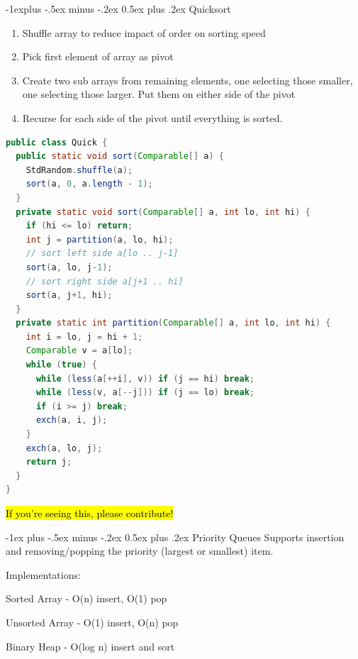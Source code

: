 \documentclass[letterpaper, 8pt]{extarticle}
\makeatletter
\renewcommand{\section}{\@startsection{section}{1}{0mm}%
                                {-1ex plus -.5ex minus -.2ex}%
                                {0.5ex plus .2ex}%
                                {\normalfont\normalsize\bfseries}}
\renewcommand{\subsection}{\@startsection{subsection}{2}{0mm}%
                                {-1explus -.5ex minus -.2ex}%
                                {0.5ex plus .2ex}%
                                {\normalfont\small\bfseries}}
\makeatother
\begin{document}
\begin{multicols*}{4}
  \subsection{Quicksort}
  \begin{enumerate}
    \item Shuffle array to reduce impact of order on sorting speed
    \item Pick first element of array as pivot
    \item Create two sub arrays from remaining elements, one selecting those smaller,
    one selecting those larger. Put them on either side of the pivot
    \item Recurse for each side of the pivot until everything is sorted.
  \end{enumerate}
  \begin{lstlisting}[language=Java, breaklines=true, postbreak=\mbox{\textcolor{red}{$\hookrightarrow$}\space}]
public class Quick {
  public static void sort(Comparable[] a) {
    StdRandom.shuffle(a);
    sort(a, 0, a.length - 1);
  }
  private static void sort(Comparable[] a, int lo, int hi) {
    if (hi <= lo) return;
    int j = partition(a, lo, hi);
    // sort left side a[lo .. j-1]
    sort(a, lo, j-1);
    // sort right side a[j+1 .. hi]
    sort(a, j+1, hi);
  }
  private static int partition(Comparable[] a, int lo, int hi) {
    int i = lo, j = hi + 1;
    Comparable v = a[lo];
    while (true) {
      while (less(a[++i], v)) if (j == hi) break;
      while (less(v, a[--j])) if (j == lo) break;
      if (i >= j) break;
      exch(a, i, j);
    }
    exch(a, lo, j);
    return j;
  }
}
  \end{lstlisting}

  \hl{If you're seeing this, please contribute!}

  \section{Priority Queues}
  Supports insertion and removing/popping the priority (largest or smallest) item.

  Implementations:
  \begin{list}{}{}
    \item Sorted Array - O(n) insert, O(1) pop
    \item Unsorted Array - O(1) insert, O(n) pop
    \item Binary Heap - O(log n) insert and sort
  \end{list}


\end{multicols*}
\end{document}

